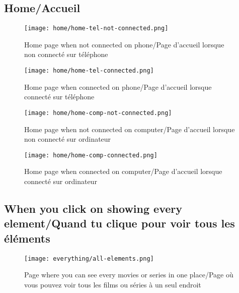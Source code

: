 \subsection{Home/Accueil}
\begin{figure}[H]
    \centering
    \texttt{[image: home/home-tel-not-connected.png]}
    \caption{Home page when not connected on phone/Page d'accueil lorsque non connecté sur téléphone}
    \label{fig:home-tel-not-connected}
\end{figure}

\begin{figure}[H]
    \centering
    \texttt{[image: home/home-tel-connected.png]}
    \caption{Home page when connected on phone/Page d'accueil lorsque connecté sur téléphone}
    \label{fig:home-tel-connected}
\end{figure}

\begin{figure}[H]
    \centering
    \texttt{[image: home/home-comp-not-connected.png]}
    \caption{Home page when not connected on computer/Page d'accueil lorsque non connecté sur ordinateur}
    \label{fig:home-comp-not-connected}
\end{figure}

\begin{figure}[H]
    \centering
    \texttt{[image: home/home-comp-connected.png]}
    \caption{Home page when connected on computer/Page d'accueil lorsque connecté sur ordinateur}
    \label{fig:home-comp-connected}
\end{figure}

\pagebreak

\subsection{When you click on showing every element/Quand tu clique pour voir tous les éléments}

\begin{figure}[H]
    \centering
    \texttt{[image: everything/all-elements.png]}
    \caption{Page where you can see every movies or series in one place/Page où vous pouvez voir tous les films ou séries à un seul endroit}
    \label{fig:everything}
\end{figure}

